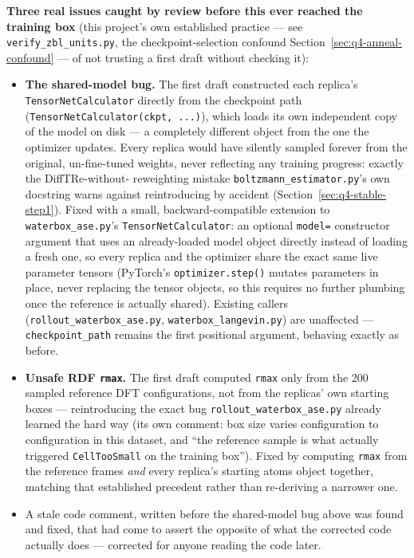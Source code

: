 \documentclass[11pt]{article}
\begin{document}
\textbf{Three real issues caught by review before this ever reached the
training box} (this project's own established practice --- see
\texttt{verify\_zbl\_units.py}, the checkpoint-selection confound
Section~\ref{sec:q4-anneal-confound} --- of not trusting a first draft
without checking it):
\begin{itemize}
  \item \textbf{The shared-model bug.} The first draft constructed each
  replica's \texttt{TensorNetCalculator} directly from the checkpoint path
  (\texttt{TensorNetCalculator(ckpt, ...)}), which loads its own
  independent copy of the model on disk --- a completely different object
  from the one the optimizer updates. Every replica would have silently
  sampled forever from the original, un-fine-tuned weights, never
  reflecting any training progress: exactly the DiffTRe-without-
  reweighting mistake \texttt{boltzmann\_estimator.py}'s own docstring
  warns against reintroducing by accident (Section~\ref{sec:q4-stable-step1}).
  Fixed with a small, backward-compatible extension to
  \texttt{waterbox\_ase.py}'s \texttt{TensorNetCalculator}: an optional
  \texttt{model=} constructor argument that uses an already-loaded model
  object directly instead of loading a fresh one, so every replica and the
  optimizer share the exact same live parameter tensors (PyTorch's
  \texttt{optimizer.step()} mutates parameters in place, never replacing
  the tensor objects, so this requires no further plumbing once the
  reference is actually shared). Existing callers
  (\texttt{rollout\_waterbox\_ase.py}, \texttt{waterbox\_langevin.py}) are
  unaffected --- \texttt{checkpoint\_path} remains the first positional
  argument, behaving exactly as before.
  \item \textbf{Unsafe RDF \texttt{rmax}.} The first draft computed
  \texttt{rmax} only from the 200 sampled reference DFT configurations, not
  from the replicas' own starting boxes --- reintroducing the exact bug
  \texttt{rollout\_waterbox\_ase.py} already learned the hard way (its own
  comment: box size varies configuration to configuration in this dataset,
  and ``the reference sample is what actually triggered
  \texttt{CellTooSmall} on the training box''). Fixed by computing
  \texttt{rmax} from the reference frames \emph{and} every replica's
  starting atoms object together, matching that established precedent
  rather than re-deriving a narrower one.
  \item A stale code comment, written before the shared-model bug above was
  found and fixed, that had come to assert the opposite of what the
  corrected code actually does --- corrected for anyone reading the code
  later.
\end{itemize}
\end{document}

